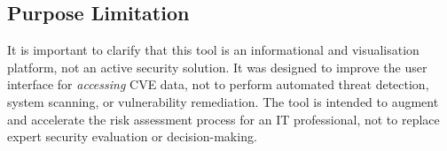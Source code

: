 \documentclass[12pt,a4paper]{article}
\begin{document}
    \subsection{Purpose Limitation}
    It is important to clarify that this tool is an informational and visualisation platform, not an active security solution.
    It was designed to improve the user interface for \textit{accessing} CVE data, not to perform automated threat detection, system scanning, or vulnerability remediation.
    The tool is intended to augment and accelerate the risk assessment process for an IT professional, not to replace expert security evaluation or decision-making.

    \clearpage
\end{document}
